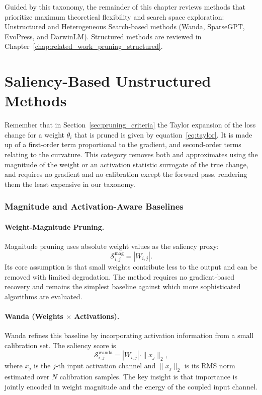 Guided by this taxonomy, the remainder of this chapter reviews methods that prioritize maximum theoretical flexibility and search space exploration: Unstructured and Heterogeneous Search-based methods (Wanda, SparseGPT, EvoPress, and DarwinLM). Structured methods are reviewed in Chapter~\ref{chap:related_work_pruning_structured}.

\section{Saliency-Based Unstructured Methods}

Remember that in Section~\ref{sec:pruning_criteria} the Taylor expansion of the
loss change for a weight $\theta_i$ that is pruned is given by equation~\eqref{eq:taylor}. It is made up of a first-order term proportional to the gradient, and second-order terms relating to the curvature. This category removes both and approximates using the magnitude of the weight or an activation statistic surrogate of the true change, and requires no gradient and no calibration except the forward pass, rendering them the least expensive in our taxonomy.

\subsubsection{Magnitude and Activation-Aware Baselines}

\paragraph{Weight-Magnitude Pruning.}
Magnitude pruning uses absolute weight values as the saliency proxy:
\begin{equation}
	\mathcal{S}^{\mathrm{mag}}_{i,j} = |W_{i,j}|.
\end{equation}
Its core assumption is that small weights contribute less to the output and can be removed with limited degradation. The method requires no gradient-based recovery and remains the simplest baseline against which more sophisticated algorithms are evaluated.

\methodsep

\paragraph{Wanda (Weights $\times$ Activations).}
Wanda \cite{sun2023simple} refines this baseline by incorporating activation information from a small calibration set. The saliency score is
\begin{equation}
	\mathcal{S}^{\mathrm{wanda}}_{i,j} = |W_{i,j}| \cdot \|x_j\|_2,
\end{equation}
where $x_j$ is the $j$-th input activation channel and $\|x_j\|_2$ is its RMS norm estimated over $N$ calibration samples. The key insight is that importance is jointly encoded in weight magnitude and the energy of the coupled input channel.

